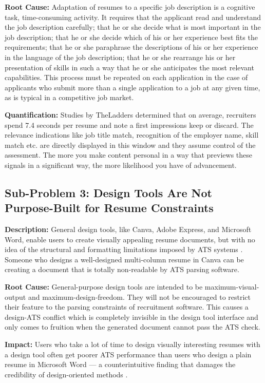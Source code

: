 \documentclass[12pt, a4paper, oneside]{report}
\begin{document}
\textbf{Root Cause:} Adaptation of resumes to a specific job description is a cognitive task, time-consuming activity. It requires that the applicant read and understand the job description carefully; that he or she decide what is most important in the job description; that he or she decide which of his or her experience best fits the requirements; that he or she paraphrase the descriptions of his or her experience in the language of the job description; that he or she rearrange his or her presentation of skills in such a way that he or she anticipates the most relevant capabilities. This process must be repeated on each application in the case of applicants who submit more than a single application to a job at any given time, as is typical in a competitive job market.


\textbf{Quantification:} Studies by TheLadders \cite{theladders2018}  determined that on average, recruiters spend 7.4 seconds per resume and note a first impressions keep or discard. The relevance indications like job title match, recognition of the employer name, skill match etc. are directly displayed in this window and they assume control of the assessment. The more you make content personal in a way that previews these signals in a significant way, the more likelihood you have of advancement.

\subsection{Sub-Problem 3: Design Tools Are Not Purpose-Built for Resume Constraints}

\textbf{Description:} General design tools, like Canva, Adobe Express, and Microsoft Word, enable users to create visually appealing resume documents, but with no idea of the structural and formatting limitations imposed by ATS systems \cite{resumeworded2022}. Someone who designs a well-designed multi-column resume in Canva can be creating a document that is totally non-readable by ATS parsing software.

\textbf{Root Cause:} General-purpose design tools are intended to be maximum-visual-output and maximum-design-freedom. They will not be encouraged to restrict their feature to the parsing constraints of recruitment software. This causes a design-ATS conflict which is completely invisible in the design tool interface and only comes to fruition when the generated document cannot pass the ATS check.

\textbf{Impact:} Users who take a lot of time to design visually interesting resumes with a design tool often get poorer ATS performance than users who design a plain resume in Microsoft Word --- a counterintuitive finding that damages the credibility of design-oriented methods \cite{jobscan2021}.
\end{document}

